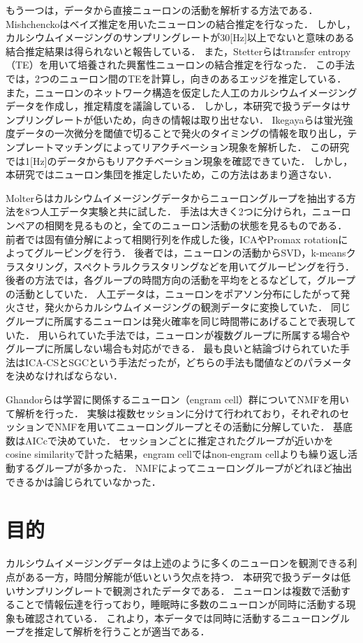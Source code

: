 もう一つは，データから直接ニューロンの活動を解析する方法である．
Mishchenckoはベイズ推定を用いたニューロンの結合推定を行なった\cite{Mishchencko2011}．
しかし，カルシウムイメージングのサンプリングレートが30[Hz]以上でないと意味のある結合推定結果は得られないと報告している．
また，Stetterらはtransfer entropy（TE）を用いて培養された興奮性ニューロンの結合推定を行なった\cite{Stetter2012}．
この手法では，2つのニューロン間のTEを計算し，向きのあるエッジを推定している．
また，ニューロンのネットワーク構造を仮定した人工のカルシウムイメージングデータを作成し，推定精度を議論している．
しかし，本研究で扱うデータはサンプリングレートが低いため，向きの情報は取り出せない．
Ikegayaらは蛍光強度データの一次微分を閾値で切ることで発火のタイミングの情報を取り出し，テンプレートマッチングによってリアクチベーション現象を解析した\cite{Ikegaya2004}．
この研究では1[Hz]のデータからもリアクチベーション現象を確認できていた．
しかし，本研究ではニューロン集団を推定したいため，この方法はあまり適さない．

Molterらはカルシウムイメージングデータからニューロングループを抽出する方法を8つ人工データ実験と共に試した\cite{Molter2018}．
手法は大きく2つに分けられ，ニューロンペアの相関を見るものと，全てのニューロン活動の状態を見るものである．
前者では固有値分解によって相関行列を作成した後，ICAやPromax rotationによってグルーピングを行う．
後者では，ニューロンの活動からSVD，k-meansクラスタリング，スペクトラルクラスタリングなどを用いてグルーピングを行う．
後者の方法では，各グループの時間方向の活動を平均をとるなどして，グループの活動としていた．
人工データは，ニューロンをポアソン分布にしたがって発火させ，発火からカルシウムイメージングの観測データに変換していた．
同じグループに所属するニューロンは発火確率を同じ時間帯にあげることで表現していた．
用いられていた手法では，ニューロンが複数グループに所属する場合やグループに所属しない場合も対応ができる．
最も良いと結論づけられていた手法はICA-CSとSGCという手法だったが，どちらの手法も閾値などのパラメータを決めなければならない．

Ghandorらは学習に関係するニューロン（engram cell）群についてNMFを用いて解析を行った\cite{Ghandour2019}．
実験は複数セッションに分けて行われており，それぞれのセッションでNMFを用いてニューロングループとその活動に分解していた．
基底数はAICcで決めていた．
セッションごとに推定されたグループが近いかをcosine similarityで計った結果，engram cellではnon-engram cellよりも繰り返し活動するグループが多かった．
NMFによってニューロングループがどれほど抽出できるかは論じられていなかった．

\section{目的}
カルシウムイメージングデータは上述のように多くのニューロンを観測できる利点がある一方，時間分解能が低いという欠点を持つ．
本研究で扱うデータは低いサンプリングレートで観測されたデータである．
ニューロンは複数で活動することで情報伝達を行っており，睡眠時に多数のニューロンが同時に活動する現象も確認されている．
これより，本データでは同時に活動するニューロングループを推定して解析を行うことが適当である．

